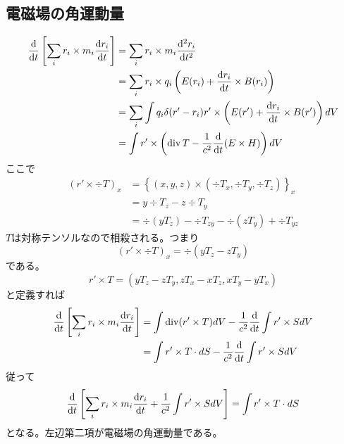 \subsection{電磁場の角運動量}
    \begin{align*}
        \dv{t}\left[\sum_i r_i \times m_i\dv{r_i}{t}\right]
            &= \sum_i r_i \times m_i\dv[2]{r_i}{t}\\
            &= \sum_i r_i \times q_i\left(E(r_i) + \dv{r_i}{t} \times B(r_i)\right)\\
            &= \sum_i \int q_i\delta(r' - r_i)r' \times \left(E(r') + \dv{r_i}{t} \times B(r')\right) dV\\
            &= \int r' \times \left(\operatorname{div} T - \frac{1}{c^2}\dv{t}(E \times H)\right) dV
    \end{align*}
    ここで
    \begin{align*}
        (r' \times \div T)_x
            &= \left\{(x, y, z) \times (\div T_x, \div T_y, \div T_z)\right\}_x\\
            &= y\div T_z - z\div T_y\\
            &= \div (yT_z) - \div T_{zy} - \div (zT_y) + \div T_{yz}
    \end{align*}
    $T$は対称テンソルなので相殺される。つまり
        \[(r' \times \div T)_x = \div (yT_z - zT_y)\]
    である。
        \[r' \times T = (yT_z - zT_y, zT_x - xT_z, xT_y - yT_x)\]
    と定義すれば
    \begin{align*}
        \dv{t}\left[\sum_i r_i \times m_i\dv{r_i}{t}\right]
            &= \int \operatorname{div}(r' \times T) dV - \frac{1}{c^2}\dv{t}\int r' \times S dV\\
            &= \int r' \times T \cdot dS - \frac{1}{c^2}\dv{t}\int r' \times S dV
    \end{align*}
    従って
        \[\dv{t}\left[\sum_i r_i \times m_i\dv{r_i}{t} + \frac{1}{c^2}\int r' \times S dV\right] = \int r' \times T \cdot dS\]
    となる。左辺第二項が電磁場の角運動量である。
